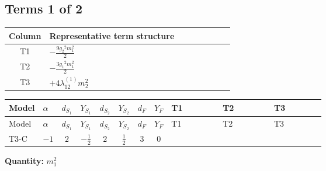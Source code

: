 \documentclass[8pt]{article}
\begin{document}
\begin{landscape}
\subsection*{Terms 1 of 2}
\begin{center}
\begin{tabular}{@{}c >{\raggedright\arraybackslash}p{0.82\linewidth}@{}}
\toprule
Column & Representative term structure \\
\midrule
T1 & \(\displaystyle -\frac{9 {g_2}^2 {m_1^2}}{2}\) \\
\midrule
T2 & \(\displaystyle -\frac{3 {g_1}^2 {m_1^2}}{2}\) \\
\midrule
T3 & \(\displaystyle +4 {\lambda_{12}^{(1)}} {m_2^2}\) \\
\midrule
\bottomrule
\end{tabular}
\end{center}
\smallskip
\tiny
\begin{longtable}{@{}llcccccc >{\raggedright\arraybackslash}p{0.21\linewidth} >{\raggedright\arraybackslash}p{0.21\linewidth} >{\raggedright\arraybackslash}p{0.21\linewidth}@{}}
\toprule
Model & $\alpha$ & $d_{S_1}$ & $Y_{S_1}$ & $d_{S_2}$ & $Y_{S_2}$ & $d_F$ & $Y_F$ & T1 & T2 & T3 \\
\midrule
\endfirsthead
\toprule
Model & $\alpha$ & $d_{S_1}$ & $Y_{S_1}$ & $d_{S_2}$ & $Y_{S_2}$ & $d_F$ & $Y_F$ & T1 & T2 & T3 \\
\midrule
\endhead
T3-C & $-1$ & $2$ & $-\frac{1}{2}$ & $2$ & $\frac{1}{2}$ & $3$ & $0$ & \scriptsize\adjustbox{max width=\linewidth}{$\begin{gathered} -\frac{9 {g_2}^2 {m_1^2}}{2}\end{gathered}$} & \scriptsize\adjustbox{max width=\linewidth}{$\begin{gathered} -\frac{3 {g_1}^2 {m_1^2}}{2}\end{gathered}$} & \scriptsize\adjustbox{max width=\linewidth}{$\begin{gathered} +4 {\lambda_{12}^{(1)}} {m_2^2}\end{gathered}$} \\
\midrule
\bottomrule
\end{longtable}
\clearpage
\noindent\textbf{Quantity: }$m_1^2$\par\smallskip

\end{landscape}
\end{document}
